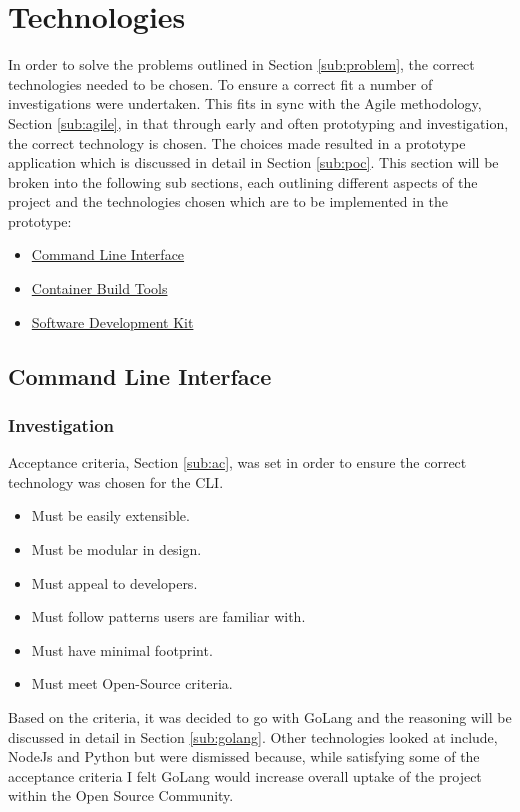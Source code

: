 \section{Technologies}
In order to solve the problems outlined in Section \ref{sub:problem}, the correct technologies needed to be chosen. To ensure a correct fit a number of investigations were undertaken. This fits in sync with the Agile methodology, Section \ref{sub:agile}, in that through early and often prototyping and investigation, the correct technology is chosen. The choices made resulted in a prototype application which is discussed in detail in Section \ref{sub:poc}. This section will be broken into the following sub sections, each outlining different aspects of the project and the technologies chosen which are to be implemented in the prototype: 
\begin{itemize}
    \item \hyperref[sub:cli_stack]{Command Line Interface}
    \item \hyperref[sub:build_invest]{Container Build Tools}
    \item \hyperref[sub:sdk_stack]{Software Development Kit}
\end{itemize}

\subsection{Command Line Interface}
\label{sub:cli_stack}
\subsubsection{Investigation}
\label{sub:cli_inves}
Acceptance criteria, Section \ref{sub:ac}, was set in order to ensure the correct technology was chosen for the \gls{CLI}.
\begin{itemize}
    \item Must be easily extensible.  
    \item Must be modular in design.
    \item Must appeal to developers.
    \item Must follow patterns users are familiar with.
    \item Must have minimal footprint.
    \item Must meet \gls{Open-Source} criteria.
\end{itemize}
Based on the criteria, it was decided to go with \gls{GoLang} and the reasoning will be discussed in detail in Section \ref{sub:golang}. Other technologies looked at include, NodeJs and Python but were dismissed because, while satisfying some of the acceptance criteria I felt GoLang would increase overall uptake of the project within the Open Source Community.

